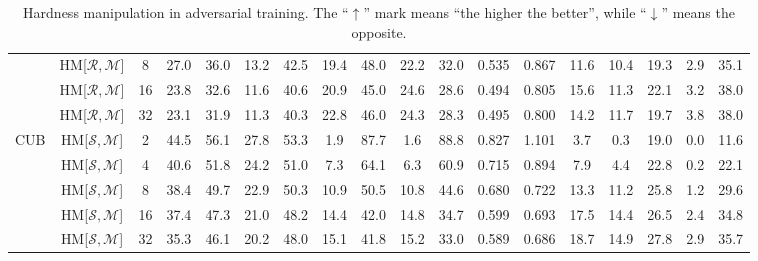 \begin{table*}
{\begin{tabular}{c|cc|cccc|ccccc|ccccc|c}
 & \textcolor{tab:blue}{HM{[}$\mathcal{R},\mathcal{M}${]}} & 8 & 27.0 & 36.0 & 13.2 & 42.5 & 19.4 & 48.0 & 22.2 & 32.0 & 0.535 & 0.867 & 11.6 & 10.4 & 19.3 & 2.9 & 35.1\tabularnewline
\rowcolor{black!7}\cellcolor{white} & \textcolor{tab:blue}{HM{[}$\mathcal{R},\mathcal{M}${]}} & 16 & 23.8 & 32.6 & 11.6 & 40.6 & 20.9 & 45.0 & 24.6 & 28.6 & 0.494 & 0.805 & 15.6 & 11.3 & 22.1 & 3.2 & 38.0\tabularnewline
 & \textcolor{tab:blue}{HM{[}$\mathcal{R},\mathcal{M}${]}} & 32 & 23.1 & 31.9 & 11.3 & 40.3 & 22.8 & 46.0 & 24.3 & 28.3 & 0.495 & 0.800 & 14.2 & 11.7 & 19.7 & 3.8 & 38.0\tabularnewline
\hline
\multirow{5}{*}{CUB} & \textcolor{tab:red}{HM{[}$\mathcal{S},\mathcal{M}${]}} & 2 & 44.5 & 56.1 & 27.8 & 53.3 & 1.9 & 87.7 & 1.6 & 88.8 & 0.827 & 1.101 & 3.7 & 0.3 & 19.0 & 0.0 & 11.6\tabularnewline
\rowcolor{black!7}\cellcolor{white} & \textcolor{tab:red}{HM{[}$\mathcal{S},\mathcal{M}${]}} & 4 & 40.6 & 51.8 & 24.2 & 51.0 & 7.3 & 64.1 & 6.3 & 60.9 & 0.715 & 0.894 & 7.9 & 4.4 & 22.8 & 0.2 & 22.1\tabularnewline
 & \textcolor{tab:red}{HM{[}$\mathcal{S},\mathcal{M}${]}} & 8 & 38.4 & 49.7 & 22.9 & 50.3 & 10.9 & 50.5 & 10.8 & 44.6 & 0.680 & 0.722 & 13.3 & 11.2 & 25.8 & 1.2 & 29.6\tabularnewline
\rowcolor{black!7}\cellcolor{white} & \textcolor{tab:red}{HM{[}$\mathcal{S},\mathcal{M}${]}} & 16 & 37.4 & 47.3 & 21.0 & 48.2 & 14.4 & 42.0 & 14.8 & 34.7 & 0.599 & 0.693 & 17.5 & 14.4 & 26.5 & 2.4 & 34.8\tabularnewline
 & \textcolor{tab:red}{HM{[}$\mathcal{S},\mathcal{M}${]}} & 32 & 35.3 & 46.1 & 20.2 & 48.0 & 15.1 & 41.8 & 15.2 & 33.0 & 0.589 & 0.686 & 18.7 & 14.9 & 27.8 & 2.9 & 35.7\tabularnewline

	\bottomrule

\end{tabular}

} \vspace{-0.5em}
\caption{Hardness manipulation in adversarial training.
%
The ``$\uparrow$'' mark means ``the higher the better'', while ``$\downarrow$''
	means the opposite.
%
	}
\label{tab:hmeff}
%
\end{table*}
